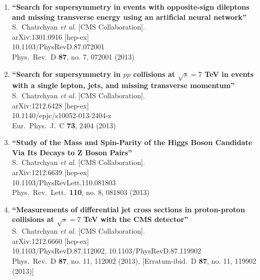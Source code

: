 \documentclass{article}
\begin{document}
\begin{enumerate}
\item%
{\bf ``Search for supersymmetry in events with opposite-sign dileptons and missing transverse energy using an artificial neural network''}
  \\{}S.~Chatrchyan {\it et al.}  [CMS Collaboration].
  \\{}arXiv:1301.0916 [hep-ex]
    \\{}10.1103/PhysRevD.87.072001
\\{}Phys.\ Rev.\ D {\bf 87}, no. 7, 072001 (2013) %


\item%
{\bf ``Search for supersymmetry in $pp$ collisions at $\sqrt{s}=7$ TeV in events with a single lepton, jets, and missing transverse momentum''}
  \\{}S.~Chatrchyan {\it et al.}  [CMS Collaboration].
  \\{}arXiv:1212.6428 [hep-ex]
    \\{}10.1140/epjc/s10052-013-2404-z
\\{}Eur.\ Phys.\ J.\ C {\bf 73}, 2404 (2013) %


\item%
{\bf ``Study of the Mass and Spin-Parity of the Higgs Boson Candidate Via Its Decays to Z Boson Pairs''}
  \\{}S.~Chatrchyan {\it et al.}  [CMS Collaboration].
  \\{}arXiv:1212.6639 [hep-ex]
    \\{}10.1103/PhysRevLett.110.081803
\\{}Phys.\ Rev.\ Lett.\  {\bf 110}, no. 8, 081803 (2013) %


\item%
{\bf ``Measurements of differential jet cross sections in proton-proton collisions at $\sqrt{s}=7$ TeV with the CMS detector''}
  \\{}S.~Chatrchyan {\it et al.}  [CMS Collaboration].
  \\{}arXiv:1212.6660 [hep-ex]
    \\{}10.1103/PhysRevD.87.112002, 10.1103/PhysRevD.87.119902
\\{}Phys.\ Rev.\ D {\bf 87}, no. 11, 112002 (2013), [Erratum-ibid.\ D {\bf 87}, no. 11, 119902 (2013)] %



\end{enumerate}
\end{document}
